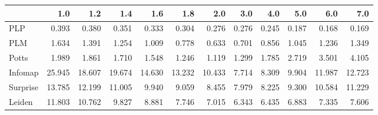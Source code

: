 \begin{tabular}{lrrrrrrrrrrr}
\toprule
{} &    1.0 &    1.2 &    1.4 &    1.6 &    1.8 &    2.0 &   3.0 &   4.0 &   5.0 &    6.0 &    7.0 \\
\midrule
PLP      &  0.393 &  0.380 &  0.351 &  0.333 &  0.304 &  0.276 & 0.276 & 0.245 & 0.187 &  0.168 &  0.169 \\
PLM      &  1.634 &  1.391 &  1.254 &  1.009 &  0.778 &  0.633 & 0.701 & 0.856 & 1.045 &  1.236 &  1.349 \\
Potts    &  1.989 &  1.861 &  1.710 &  1.548 &  1.246 &  1.119 & 1.299 & 1.785 & 2.719 &  3.501 &  4.105 \\
Infomap  & 25.945 & 18.607 & 19.674 & 14.630 & 13.232 & 10.433 & 7.714 & 8.309 & 9.904 & 11.987 & 12.723 \\
Surprise & 13.785 & 12.199 & 11.005 &  9.940 &  9.059 &  8.455 & 7.979 & 8.225 & 9.300 & 10.584 & 11.229 \\
Leiden   & 11.803 & 10.762 &  9.827 &  8.881 &  7.746 &  7.015 & 6.343 & 6.435 & 6.883 &  7.335 &  7.606 \\
\bottomrule
\end{tabular}
